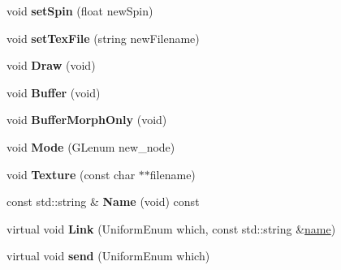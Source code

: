 \begin{DoxyCompactItemize}
\item 
\hypertarget{class_particle_ac0cd12e63886b12d2b99549ecb552838}{void {\bfseries set\-Spin} (float new\-Spin)}\label{class_particle_ac0cd12e63886b12d2b99549ecb552838}

\item 
\hypertarget{class_particle_a5a387ad04e530af85dcd64763282d3a0}{void {\bfseries set\-Tex\-File} (string new\-Filename)}\label{class_particle_a5a387ad04e530af85dcd64763282d3a0}

\item 
\hypertarget{class_object_a3afa1b9af32b78d81b5de0836c511aeb}{void {\bfseries Draw} (void)}\label{class_object_a3afa1b9af32b78d81b5de0836c511aeb}

\item 
\hypertarget{class_object_a35c89a8eb8a5b742a9025331119bfc7c}{void {\bfseries Buffer} (void)}\label{class_object_a35c89a8eb8a5b742a9025331119bfc7c}

\item 
\hypertarget{class_object_a754f9f36a528f050b25d053ed43015f0}{void {\bfseries Buffer\-Morph\-Only} (void)}\label{class_object_a754f9f36a528f050b25d053ed43015f0}

\item 
\hypertarget{class_object_ac6ccf69d21c4c902c62829c48ef6cf5b}{void {\bfseries Mode} (G\-Lenum new\-\_\-node)}\label{class_object_ac6ccf69d21c4c902c62829c48ef6cf5b}

\item 
\hypertarget{class_object_aa104adfbcc2cae4bd68c053cc3dab721}{void {\bfseries Texture} (const char $\ast$$\ast$filename)}\label{class_object_aa104adfbcc2cae4bd68c053cc3dab721}

\item 
\hypertarget{class_object_a890760dff9df547454112ff84510040c}{const std\-::string \& {\bfseries Name} (void) const }\label{class_object_a890760dff9df547454112ff84510040c}

\item 
\hypertarget{class_object_accde5aa6e8d0d582719e94c414c2341c}{virtual void {\bfseries Link} (Uniform\-Enum which, const std\-::string \&\hyperlink{class_object_a24457e0a387492c80594aec7681a2277}{name})}\label{class_object_accde5aa6e8d0d582719e94c414c2341c}

\item 
\hypertarget{class_object_a34258ee199342d785c29d18c49d54e71}{virtual void {\bfseries send} (Uniform\-Enum which)}\label{class_object_a34258ee199342d785c29d18c49d54e71}


\end{DoxyCompactItemize}
